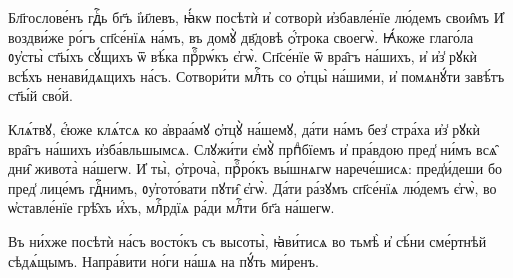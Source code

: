 
\cuLettrine
Бл҃гослове́нъ гдⷭ҇ь бг҃ъ і҆и҃левъ, ꙗ҆́кѡ посѣтѝ  и҆ сотворѝ и҆збавле́нїе лю́демъ свои̑мъ  
\hKv И҆ воздви́же ро́гъ сп҃се́нїѧ на́мъ, въ домꙋ̀  дв҃довѣ ѻ҆́трока своегѡ̀. 
\hKv Ꙗ҆́коже глаго́ла ᲂу҆сты̀  ст҃ы́хъ сꙋ́щихъ ѿ вѣ́ка прⷪ҇рѡ́къ є҆гѡ̀. 
\hKv Сп҃се́нїе  ѿ вра̑гъ на́шихъ, и҆ и҆з̾ рꙋкѝ всѣ́хъ ненави́дѧщихъ  на́съ. 
\hKv Сотвори́ти млⷭ҇ть со ѻ҆тцы̀ на́шими, и҆  помѧнꙋ́ти завѣ́тъ ст҃ы́й сво́й. 
%

\hKv Клѧ́твꙋ, є҆́юже клѧ́тсѧ ко а҆враа́мꙋ ѻ҆тцꙋ̀  на́шемꙋ, да́ти на́мъ без̾ стра́ха и҆з̾ рꙋкѝ вра̑гъ  на́шихъ и҆зба́вльшымсѧ. 
\hKv Слꙋжи́ти є҆мꙋ̀ прпⷣбїемъ и҆  пра́вдою пред̾ ни́мъ всѧ̑ дни̑ живота̀ на́шегѡ. 
\hKv И҆  ты̀, ѻ҆троча̀, прⷪ҇ро́къ вы́шнѧгѡ нарече́шисѧ: пред̾и́деши  бо пред̾ лице́мъ гдⷭ҇нимъ, ᲂу҆гото́вати пꙋти̑ є҆гѡ̀. 
\hKv Да́ти ра́зꙋмъ сп҃се́нїѧ лю́демъ є҆гѡ̀, во ѡ҆ставле́нїе  грѣ̑хъ и҆́хъ, млⷭ҇рдїѧ ра́ди млⷭ҇ти бг҃а на́шегѡ.  
%

\hKv Въ ни́хже посѣтѝ на́съ восто́къ съ высоты̀,  ꙗ҆ви́тисѧ во тьмѣ̀ и҆ сѣ́ни сме́ртнѣй сѣдѧ́щымъ. 
\hKv  Напра́вити но́ги на́шѧ на пꙋ́ть ми́ренъ. 
%

